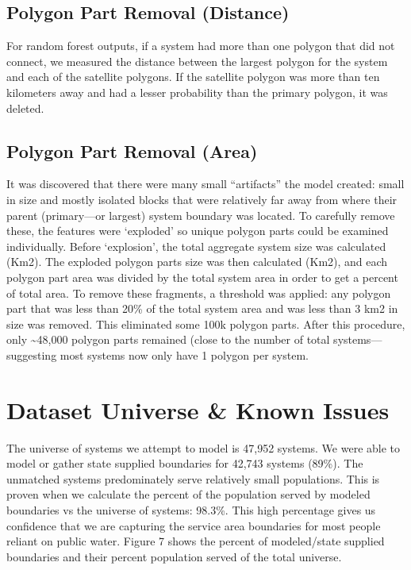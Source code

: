 \documentclass[12pt]{article}
\begin{document}
\subsection{Polygon Part Removal
(Distance)}\label{polygon-part-removal-distance}

For random forest outputs, if a system had more than one polygon that
did not connect, we measured the distance between the largest polygon
for the system and each of the satellite polygons. If the satellite
polygon was more than ten kilometers away and had a lesser probability
than the primary polygon, it was deleted.

\subsection{Polygon Part Removal
(Area)}\label{polygon-part-removal-area}

It was discovered that there were many small ``artifacts'' the model
created: small in size and mostly isolated blocks that were relatively
far away from where their parent (primary---or largest) system boundary
was located. To carefully remove these, the features were `exploded' so
unique polygon parts could be examined individually. Before `explosion',
the total aggregate system size was calculated (Km2). The exploded
polygon parts size was then calculated (Km2), and each polygon part area
was divided by the total system area in order to get a percent of total
area. To remove these fragments, a threshold was applied: any polygon
part that was less than 20\% of the total system area and was less than
3 km2 in size was removed. This eliminated some 100k polygon parts.
After this procedure, only \textasciitilde48,000 polygon parts remained
(close to the number of total systems---suggesting most systems now only
have 1 polygon per system.

\section{Dataset Universe \& Known
Issues}\label{dataset-universe-known-issues}

The universe of systems we attempt to model is 47,952 systems. We were
able to model or gather state supplied boundaries for 42,743 systems
(89\%). The unmatched systems predominately serve relatively small
populations. This is proven when we calculate the percent of the
population served by modeled boundaries vs the universe of systems:
98.3\%. This high percentage gives us confidence that we are capturing
the service area boundaries for most people reliant on public water.
Figure 7 shows the percent of modeled/state supplied boundaries and
their percent population served of the total universe.
\end{document}
